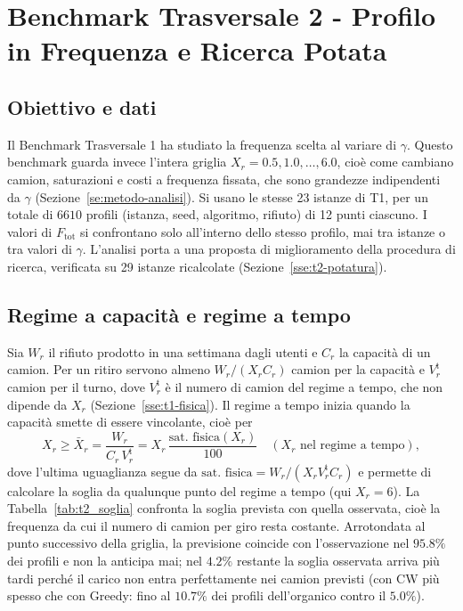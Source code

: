 \section{Benchmark Trasversale 2 - Profilo in Frequenza e Ricerca Potata}\label{se:t2}

\subsection{Obiettivo e dati}\label{sse:t2-dati}

Il Benchmark Trasversale 1 ha studiato la frequenza scelta al variare di $\gamma$. Questo benchmark guarda invece l'intera griglia $X_r=0.5,1.0,\dots,6.0$, cioè come cambiano camion, saturazioni e costi a frequenza fissata, che sono grandezze indipendenti da $\gamma$ (Sezione~\ref{se:metodo-analisi}). Si usano le stesse 23 istanze di T1, per un totale di $6610$ profili (istanza, seed, algoritmo, rifiuto) di 12 punti ciascuno. I valori di $F_{\mathrm{tot}}$ si confrontano solo all'interno dello stesso profilo, mai tra istanze o tra valori di $\gamma$. L'analisi porta a una proposta di miglioramento della procedura di ricerca, verificata su 29 istanze ricalcolate (Sezione~\ref{sse:t2-potatura}).

\subsection{Regime a capacità e regime a tempo}\label{sse:t2-regimi}

Sia $W_r$ il rifiuto prodotto in una settimana dagli utenti e $C_r$ la capacità di un camion. Per un ritiro servono almeno $W_r/(X_r C_r)$ camion per la capacità e $V^{\mathrm{t}}_r$ camion per il turno, dove $V^{\mathrm{t}}_r$ è il numero di camion del regime a tempo, che non dipende da $X_r$ (Sezione~\ref{sse:t1-fisica}). Il regime a tempo inizia quando la capacità smette di essere vincolante, cioè per
\begin{equation}\label{eq:t2_soglia}
	X_r\ge\bar X_r=\frac{W_r}{C_r\,V^{\mathrm{t}}_r}=X_r\,\frac{\text{sat. fisica}(X_r)}{100}\quad(X_r\text{ nel regime a tempo}),
\end{equation}
dove l'ultima uguaglianza segue da $\text{sat. fisica}=W_r/(X_r V^{\mathrm{t}}_r C_r)$ e permette di calcolare la soglia da qualunque punto del regime a tempo (qui $X_r=6$). La Tabella~\ref{tab:t2_soglia} confronta la soglia prevista con quella osservata, cioè la frequenza da cui il numero di camion per giro resta costante. Arrotondata al punto successivo della griglia, la previsione coincide con l'osservazione nel $95.8\%$ dei profili e non la anticipa mai; nel $4.2\%$ restante la soglia osservata arriva più tardi perché il carico non entra perfettamente nei camion previsti (con CW più spesso che con Greedy: fino al $10.7\%$ dei profili dell'organico contro il $5.0\%$).

